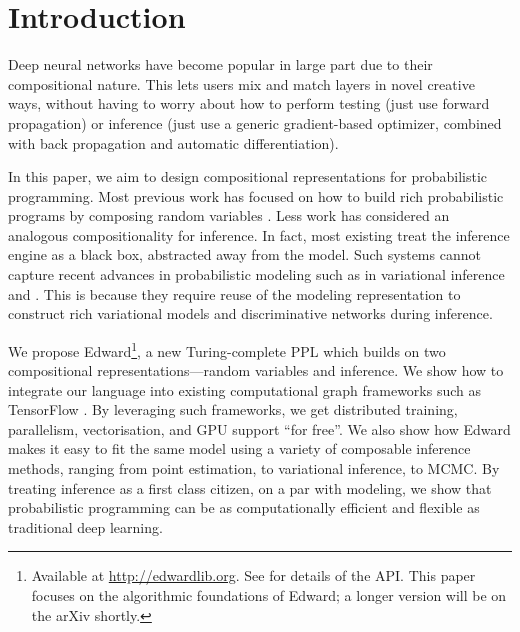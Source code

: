 \section{Introduction}
\label{sec:introduction}

Deep neural networks have become popular in large part due to their
compositional nature. This lets users mix and match layers in novel
creative ways, without having to worry about how to perform testing
(just use forward propagation) or inference (just use a generic
gradient-based optimizer, combined with back propagation and automatic
differentiation).

In this paper, we aim to design compositional representations for
probabilistic programming.
Most previous work has focused on how to build rich probabilistic
programs by composing random variables
\citep{goodman2012church,ghahramani2015probabilistic,lake2016building}.
Less work has considered an analogous compositionality for inference.
In fact, most existing  treat the inference
engine as a black box, abstracted away from the model. Such
systems cannot capture recent advances in probabilistic modeling such
as in variational inference
\citep{kingma2014autoencoding,rezende2015variational,tran2016variational}
and
 \citep{goodfellow2014generative}.
This is because they require reuse of the modeling representation to
construct rich variational models and discriminative networks
during inference.

We propose Edward\footnote{%
Available at \url{http://edwardlib.org}. See \citet{tran2016edward} for
details of the API. This paper focuses on the algorithmic foundations
of Edward; a longer version will be on the arXiv shortly.
}, a new Turing-complete \acrlong{PPL} which builds on
two compositional representations---random variables and
inference.
We show how to integrate our language into existing computational
graph frameworks such as TensorFlow \citep{abadi2016tensorflow}.
By leveraging such frameworks, we get distributed training,
parallelism, vectorisation, and \gls{GPU} support ``for
free''.
We also show how Edward makes it easy to fit the same model using a
variety of composable inference methods, ranging from point
estimation, to variational inference, to \acrshort{MCMC}.
By treating inference as a first class citizen, on a par with
modeling, we show that probabilistic programming can be as computationally efficient
and flexible as traditional deep learning.
